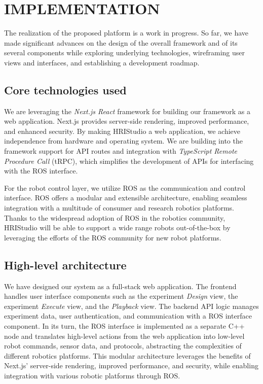 \documentclass[letterpaper, 10 pt, conference]{ieeeconf}
\begin{document}
\section{IMPLEMENTATION}

The realization of the proposed platform is a work in progress. So far, we have made significant advances on the design of the overall framework and of its several components while exploring underlying technologies, wireframing user views and interfaces, and establishing a development roadmap.

\subsection{Core technologies used}

We are leveraging the \emph{Next.js React} \cite{next} framework for building our framework as a web application. Next.js provides server-side rendering, improved performance, and enhanced security. By making HRIStudio a web application, we achieve independence from hardware and operating system. We are building into the framework support for API routes and integration with \emph{TypeScript Remote Procedure Call} (tRPC), which simplifies the development of APIs for interfacing with the ROS interface.

For the robot control layer, we utilize ROS as the communication and control interface. ROS offers a modular and extensible architecture, enabling seamless integration with a multitude of consumer and research robotics platforms. Thanks to the widespread adoption of ROS in the robotics community, HRIStudio will be able to support a wide range robots out-of-the-box by leveraging the  efforts of the ROS community for new robot platforms.

\subsection{High-level architecture}

We have designed our system as a full-stack web application.  The frontend handles user interface components such as the experiment \emph{Design} view, the experiment \emph{Execute} view, and the \emph{Playback} view. The backend API logic manages experiment data, user authentication, and communication with a ROS interface component. In its turn, the ROS interface is implemented as a separate C++ node and translates high-level actions from the web application into low-level robot commands, sensor data, and protocols, abstracting the complexities of different robotics platforms. This modular architecture leverages the benefits of Next.js' server-side rendering, improved performance, and security, while enabling integration with various robotic platforms through ROS.
\end{document}
